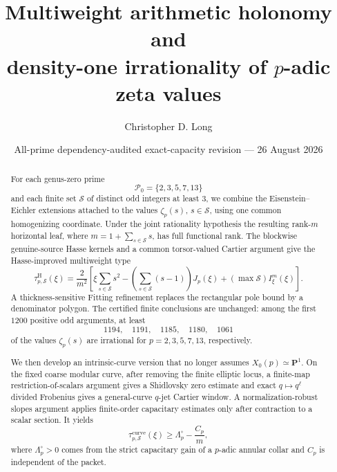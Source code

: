 \documentclass[11pt]{article}
\title{Multiweight arithmetic holonomy and\\
density-one irrationality of $p$-adic zeta values}
\author{Christopher D. Long}
\date{All-prime dependency-audited exact-capacity revision --- 26 August 2026}
\theoremstyle{definition}
\theoremstyle{remark}
\begin{document}
\maketitle

\begin{abstract}
For each genus-zero prime
\[
 \mathcal P_0=\{2,3,5,7,13\}
\]
and each finite set $\mathcal S$ of distinct odd integers at least $3$, we
combine the Eisenstein--Eichler extensions attached to the values
$\zeta_p(s)$, $s\in\mathcal S$, using one common homogenizing coordinate.
Under the joint rationality hypothesis the resulting rank-$m$ horizontal
leaf, where $m=1+\sum_{s\in\mathcal S}s$, has full functional rank.  The
blockwise genuine-source Hasse kernels and a common torsor-valued Cartier
argument give the Hasse-improved multiweight type
\[
 \tau^{\mathrm H}_{p,\mathcal S}(\xi)
 =\frac{2}{m^2}\left[
 \xi\sum_{s\in\mathcal S}s^2
 -\left(\sum_{s\in\mathcal S}(s-1)\right)J_p(\xi)
 +(\max\mathcal S)I^m_\xi(\xi)
 \right].
\]
A thickness-sensitive Fitting refinement replaces the rectangular pole bound
by a denominator polygon.  The certified finite conclusions are unchanged:
among the first $1200$ positive odd arguments, at least
\[
1194,\quad1191,\quad1185,\quad1180,\quad1061
\]
of the values $\zeta_p(s)$ are irrational for
$p=2,3,5,7,13$, respectively.

We then develop an intrinsic-curve version that no longer assumes
$X_0(p)\simeq\mathbf P^1$.  On the fixed coarse modular curve, after
removing the finite elliptic locus, a finite-map restriction-of-scalars
argument gives a Shidlovsky zero estimate and exact
$q\mapsto q^\ell$ divided Frobenius gives a general-curve $q$-jet Cartier
window.  A normalization-robust slopes argument applies finite-order
capacitary estimates only after contraction to a scalar section.  It yields
\[
 \tau^{\mathrm{curve}}_{p,\mathcal S}(\xi)
 \ge \Lambda_p^\circ-\frac{C_p}{m},
\]
where $\Lambda_p^\circ>0$ comes from the strict capacitary gain of a
$p$-adic annular collar and $C_p$ is independent of the packet.


\end{abstract}
\end{document}
